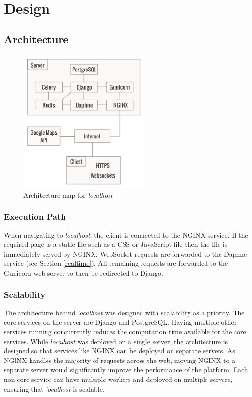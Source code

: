 \section{Design}

\subsection{Architecture}

\begin{figure}[!h]
\centering
\includegraphics[width=250px]{assets/architecture.png}
\caption{Architecture map for \emph{localhost}}
\label{fig:architecture_map}
\end{figure}

\subsubsection{Execution Path}

When navigating to \emph{localhost}, the client is connected to the NGINX
service. If the required page is a static file such as a CSS or JavaScript
file then the file is immediately served by NGINX. WebSocket requests are
forwarded to the Daphne service (see Section \ref{realtime}). All remaining
requests are forwarded to the Gunicorn web server to then be redirected to
Django.

\subsubsection{Scalability}

The architecture behind \emph{localhost} was designed with scalability as a
priority. The core services on the server are Django and PostgreSQL.
Having multiple other services running concurrently reduces the computation
time available for the core services. While \emph{localhost} was deployed on
a single server, the architecture is designed so that services like NGINX can
be deployed on separate servers. As NGINX handles the majority of requests
across the web, moving NGINX to a separate server would significantly improve
the performance of the platform. Each non-core service can have multiple
workers and deployed on multiple servers, ensuring that \emph{localhost} is
scalable.

